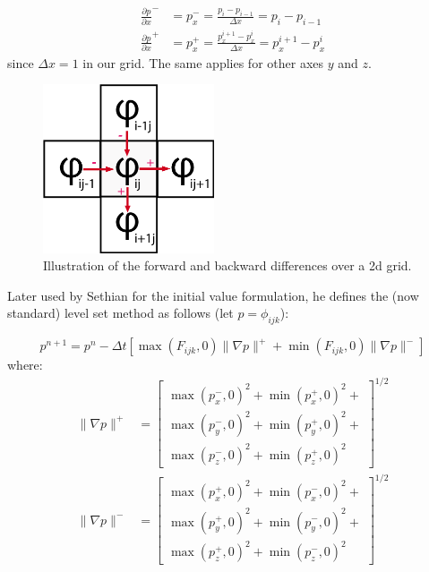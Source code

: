 \documentclass{article}
\begin{document}
\begin{align}
    \frac{\partial p}{\partial x}^{-} &= p^{-}_x = \frac{p_i -
    p_{i-1}}{ \Delta x} = p_i - p_{i-1} \\
    \frac{\partial p}{\partial x}^{+} &= p^{+}_x = \frac{p^{i+1}_x -
    p^i_x}{ \Delta x} = p^{i+1}_x - p^i_x  
\end{align} since $ \Delta x = 1 $ in our grid. The same applies for other axes
$y$ and $z$.

\begin{figure}[htb]
  \centering
  \includegraphics[width=0.45\textwidth]{img/upwind_grid.png}
  \caption{Illustration of the forward and backward differences over a 2d grid.}    
\end{figure}


Later used by Sethian\cite{sethian1999level} \cite{sethian1999advancing} for the
initial value formulation, he defines the (now standard) level set method as
follows (let $ p = \phi_{ijk}$):

\[
p^{n+1} = p^{n} - \Delta t [ \max(F_{ijk}, 0) \| \nabla p \|^{+} + \min(F_{ijk},
0) \| \nabla p \|^{-} ]
\]
where:
\begin{align}
    \| \nabla p \|^{+} & = 
    \begin{bmatrix}
        \max(p^{-}_x, 0)^2 + \min(p^{+}_x, 0)^2 + \\
        \max(p^{-}_y, 0)^2 + \min(p^{+}_y, 0)^2 + \\
        \max(p^{-}_z, 0)^2 + \min(p^{+}_z, 0)^2
    \end{bmatrix}^{1/2}  \\
    \| \nabla p \|^{-} & = 
    \begin{bmatrix}
        \max(p^{+}_x, 0)^2 + \min(p^{-}_x, 0)^2 + \\
        \max(p^{+}_y, 0)^2 + \min(p^{-}_y, 0)^2 + \\
        \max(p^{+}_z, 0)^2 + \min(p^{-}_z, 0)^2
    \end{bmatrix}^{1/2} 
\end{align}
\end{document}
